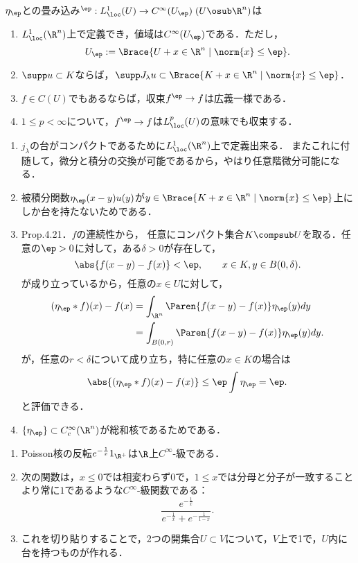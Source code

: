 \documentclass[uplatex,dvipdfmx]{jsreport}
\begin{document}
\begin{lemma}[軟化子の性質]
    $\eta_\ep$との畳み込み${}^\ep:L^1_\loc(U)\to C^\infty(U_\ep)\;(U\osub\R^n)$は
    \begin{enumerate}
        \item $L^1_\loc(\R^n)$上で定義でき，値域は$C^\infty(U_\ep)$である．ただし，
        \[U_\ep:=\Brace{U+x\in\R^n\mid\norm{x}\le\ep}.\]
        \item $\supp u\subset K$ならば，$\supp J_\lambda u\subset \Brace{K+x\in\R^n\mid\norm{x}\le\ep}$．
        \item $f\in C(U)$でもあるならば，収束$f^\ep\to f$は広義一様である．
        \item $1\le p<\infty$について，$f^\ep\to f$は$L^p_\loc(U)$の意味でも収束する．
    \end{enumerate}
\end{lemma}
\begin{Proof}\mbox{}
    \begin{enumerate}
        \item $j_\lambda$の台がコンパクトであるために$L^1_\loc(\R^n)$上で定義出来る．
        またこれに付随して，微分と積分の交換が可能であるから，やはり任意階微分可能になる．
        \item 被積分関数$\eta_\ep(x-y)u(y)$が$y\in\Brace{K+x\in\R^n\mid\norm{x}\le\ep}$上にしか台を持たないためである．
        \item \cite{Brezis-FunctionalAnalysis} Prop.4.21．$f$の連続性から，
        任意にコンパクト集合$K\compsub U$を取る．任意の$\ep>0$に対して，ある$\delta>0$が存在して，
        \[\abs{f(x-y)-f(x)}<\ep,\qquad x\in K,y\in B(0,\delta).\]
        が成り立っているから，任意の$x\in U$に対して，
        \begin{align*}
            (\eta_\ep*f)(x)-f(x)&=\int_{\R^n}\Paren{f(x-y)-f(x)}\eta_\ep(y)dy\\
            &=\int_{B(0,r)}\Paren{f(x-y)-f(x)}\eta_\ep(y)dy.
        \end{align*}
        が，任意の$r<\delta$について成り立ち，特に任意の$x\in K$の場合は
        \[\abs{(\eta_\ep*f)(x)-f(x)}\le\ep\int\eta_\ep=\ep.\]
        と評価できる．
        \item $\{\eta_\ep\}\subset C_c^\infty(\R^n)$が総和核であるためである．
    \end{enumerate}
\end{Proof}

\begin{observation}[1の分割を与える隆起関数]\mbox{}
    \begin{enumerate}
        \item Poisson核の反転$e^{-\frac{1}{x}}1_{\R^+}$は$\R$上$C^\infty$-級である．
        \item 次の関数は，$x\le 0$では相変わらず$0$で，$1\le x$では分母と分子が一致することより常に$1$であるような$C^\infty$-級関数である：
        \[\frac{e^{-\frac{1}{x}}}{e^{-\frac{1}{x}}+e^{-\frac{1}{1-x}}}.\]
        \item これを切り貼りすることで，2つの開集合$U\subset V$について，$V$上で1で，$U$内に台を持つものが作れる．
    \end{enumerate}
\end{observation}
\end{document}
